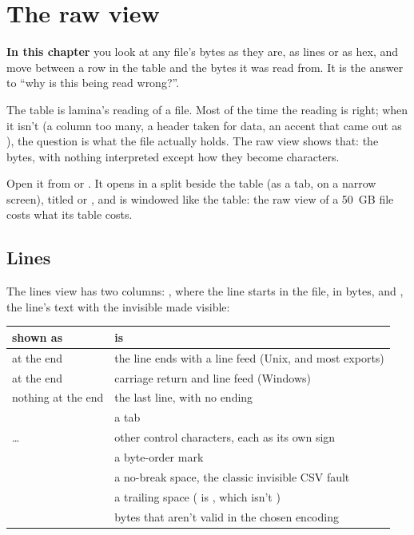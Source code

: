 \chapter{The raw view}\label{ch:raw}
\begin{goals}
\textbf{In this chapter} you look at any file's bytes as they are, as lines or as hex, and move between a
row in the table and the bytes it was read from. It is the answer to ``why is this being read wrong?''.
\end{goals}

The table is lamina's reading of a file. Most of the time the reading is right; when it isn't (a column
too many, a header taken for data, an accent that came out as ), the question is what the file
actually holds. The raw view shows that: the bytes, with nothing interpreted except how they become
characters.

Open it from  or . It opens in a
split beside the table (as a tab, on a narrow screen), titled  or
, and is windowed like the table: the raw view of a 50~GB file costs what its table
costs.


\section{Lines}\label{sec:raw-lines}

The lines view has two columns: , where the line starts in the file, in bytes, and
, the line's text with the invisible made visible:

\begin{center}\small
\begin{tabularx}{\linewidth}{@{}lL@{}}
\toprule
\sffamily\bfseries shown as & \sffamily\bfseries is \\
\midrule
{} at the end & the line ends with a line feed (Unix, and most exports) \\
 at the end & carriage return and line feed (Windows) \\
nothing at the end & the last line, with no ending \\
 & a tab \\
  … & other control characters, each as its own sign \\
 & a byte-order mark \\
 & a no-break space, the classic invisible CSV fault \\
 & a trailing space ( is , which isn't ) \\
 & bytes that aren't valid in the chosen encoding \\
\bottomrule
\end{tabularx}
\end{center}

